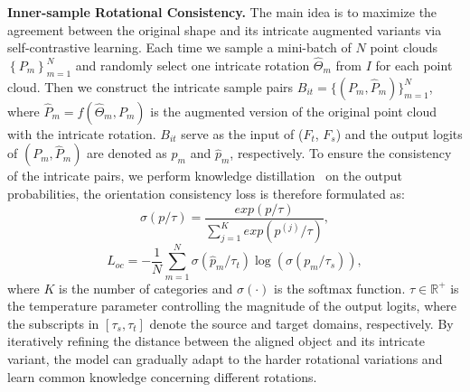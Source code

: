 \noindent\textbf{Inner-sample Rotational Consistency.} The main idea is to maximize the agreement between the original shape and its intricate augmented variants via self-contrastive learning. Each time we sample a mini-batch of $N$ point clouds $\left\{P_{m}\right\}^N_{m=1}$ and randomly select one intricate rotation $\hat{\Theta}_m$ from $I$ for each point cloud. Then we construct the intricate sample pairs $B_{it} = \{(P_{m}, \hat{P}_m )\}^N_{m=1}$, where $\hat{P}_m = f(\hat{\Theta}_{m}, P_m)$ is the augmented version of the original point cloud with the intricate rotation. $B_{it}$ serve as the input of (${F_t}$, $F_s$) and the output logits of $(P_{m}, \hat{P}_m )$ are denoted as $p_m$ and $\hat{p}_m$, respectively. To ensure the consistency of the intricate pairs, we perform knowledge distillation~\cite{hinton2015distilling} on the output probabilities, the orientation consistency loss is therefore formulated as:
\begin{equation}\label{eq5-0}
    \sigma(p/\tau) = \frac{exp(p/\tau)}{\sum_{j=1}^{K}{exp(p^{(j)}/\tau)}},
\end{equation}
\begin{equation}
    L_{oc} = -\frac{1}{N}\sum_{m=1}^{N} \sigma(\hat{p}_m/\tau_t)\log(\sigma(p_m /\tau_s)), \label{eq5}
\end{equation}
where $K$ is the number of categories and $\sigma(\cdot)$ is the softmax function. $\tau \in \mathbb{R^+}$ is the temperature parameter controlling the magnitude of the output logits, where the subscripts in $\left[\tau_s, \tau_t\right]$ denote the source and target domains, respectively. By iteratively refining the distance between the aligned object and its intricate variant, the model can gradually adapt to the harder rotational variations and learn common knowledge concerning different rotations.


